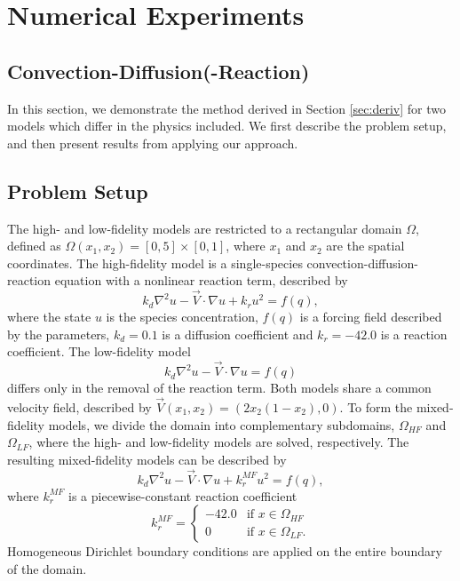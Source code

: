 \section{Numerical Experiments}

\subsection{Convection-Diffusion(-Reaction)} \label{sec:cdvcdr}

In this section, we demonstrate the method derived in Section \ref{sec:deriv} for two models which differ in the physics included. We first describe the problem setup, and then present results from applying our approach.

\subsection{Problem Setup} \label{sec:cdvcdrSetup}

The high- and low-fidelity models are restricted to a rectangular domain $\Omega$, defined as $\Omega(x_1,x_2)=[0,5]\times[0,1]$, where $x_1$ and $x_2$ are the spatial coordinates. The high-fidelity model is a single-species convection-diffusion-reaction equation with a nonlinear reaction term, described by
\begin{equation}
k_d\nabla^2 u - \vec{V}\cdot\nabla u + k_ru^2= f(q),
\label{eq:cdvcdrHF}
\end{equation}
where the state $u$ is the species concentration, $f(q)$ is a forcing field described by the parameters, $k_d = 0.1$ is a diffusion coefficient and $k_r = -42.0$ is a reaction coefficient. The low-fidelity model
\begin{equation}
k_d\nabla^2 u - \vec{V}\cdot\nabla u = f(q)
\end{equation}
differs only in the removal of the reaction term. Both models share a common velocity field, described by $\vec{V}(x_1,x_2) = (2x_2(1-x_2),0)$. To form the mixed-fidelity models, we divide the domain into complementary subdomains, $\Omega_{HF}$ and $\Omega_{LF}$, where the high- and low-fidelity models are solved, respectively. The resulting mixed-fidelity models can be described by 
\begin{equation}
k_d\nabla^2 u - \vec{V}\cdot\nabla u + k^{MF}_ru^2= f(q),
\end{equation}
where $k^{MF}_r$ is a piecewise-constant reaction coefficient
\begin{equation}
k^{MF}_r=
\begin{cases}
-42.0 & \textrm{if }x\in\Omega_{HF} \\
0 & \textrm{if }x\in\Omega_{LF}.
\end{cases}
\end{equation}
Homogeneous Dirichlet boundary conditions are applied on the entire boundary of the domain.

